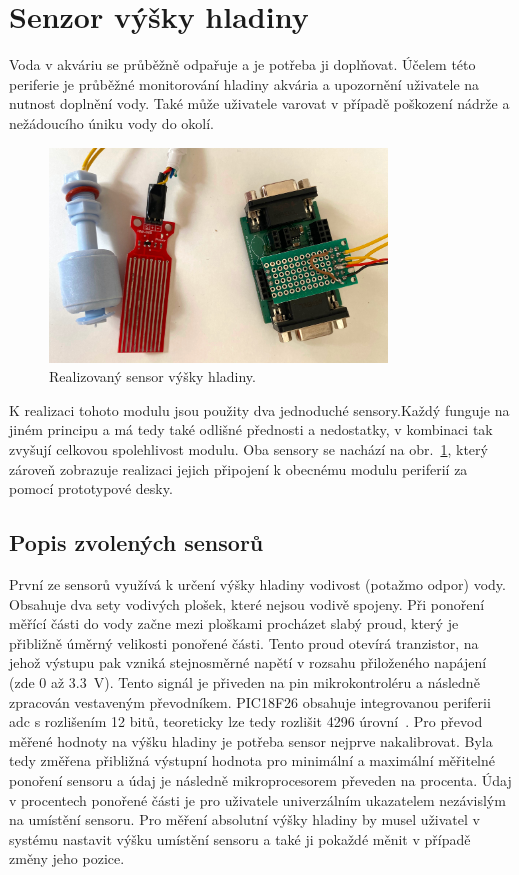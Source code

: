 \section{Senzor výšky hladiny}
\label{sec:perif-sensor-hladina}
    Voda v akváriu se průběžně odpařuje a je potřeba ji doplňovat. Účelem této periferie je průběžné monitorování hladiny akvária a upozornění uživatele na nutnost doplnění vody. Také může uživatele varovat v případě poškození nádrže a nežádoucího úniku vody do okolí. 

    \begin{figure}[h!]
        \centering
        \includegraphics[width=0.8\textwidth]{obrazky/foto/sensor_hladiny.jpeg}
        \caption{Realizovaný sensor výšky hladiny.}
        \label{fig:obrazky-foto-sensor_hladiny-jpeg}
    \end{figure}
    

    K realizaci tohoto modulu jsou použity dva jednoduché sensory.Každý funguje na jiném principu a má tedy také odlišné přednosti a nedostatky, v kombinaci tak zvyšují celkovou spolehlivost modulu. Oba sensory se nachází na obr.~\ref{fig:obrazky-foto-sensor_hladiny-jpeg}, který zároveň zobrazuje realizaci jejich připojení k obecnému modulu periferií za pomocí prototypové desky. 

    \subsection{Popis zvolených sensorů}
    První ze sensorů využívá k určení výšky hladiny vodivost (potažmo odpor) vody. Obsahuje dva sety vodivých plošek, které nejsou vodivě spojeny. Při ponoření měřící části do vody začne mezi ploškami procházet slabý proud, který je přibližně úměrný velikosti ponořené části. Tento proud otevírá tranzistor, na jehož výstupu pak vzniká stejnosměrné napětí v rozsahu přiloženého napájení (zde 0 až \qty{3.3}{V}). Tento signál je přiveden na pin mikrokontroléru a následně zpracován vestaveným převodníkem. PIC18F26 obsahuje integrovanou periferii \acs{adc} s rozlišením 12 bitů, teoreticky lze tedy rozlišit \num{4296} úrovní~\cite{PIC18F26Q83}. Pro převod měřené hodnoty na výšku hladiny je potřeba sensor nejprve nakalibrovat. Byla tedy změřena přibližná výstupní hodnota pro minimální a maximální měřitelné ponoření sensoru a údaj je následně mikroprocesorem převeden na procenta. Údaj v procentech ponořené části je pro uživatele univerzálním ukazatelem nezávislým na umístění sensoru. Pro měření absolutní výšky hladiny by musel uživatel v systému nastavit výšku umístění sensoru a také ji pokaždé měnit v případě změny jeho pozice.

